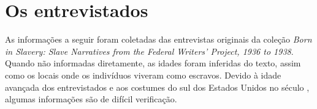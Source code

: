\chapter{Os entrevistados}

As informações a seguir foram coletadas das entrevistas originais da
coleção \emph{Born in Slavery: Slave Narratives from the Federal
Writers' Project, 1936 to 1938}. Quando não informadas diretamente, as
idades foram inferidas do texto, assim como os locais onde os indivíduos
viveram como escravos. Devido à idade avançada dos entrevistados e aos
costumes do sul dos Estados Unidos no século , algumas informações
são de difícil verificação.


